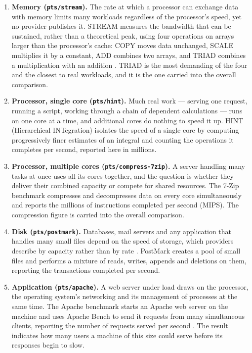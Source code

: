 \begin{enumerate}
  \item \textbf{Memory (\texttt{pts/stream}).} The rate at which a processor can exchange data with memory
  limits many workloads regardless of the processor's speed, yet no provider
  publishes it. STREAM measures the bandwidth that can be sustained, rather than a
  theoretical peak, using four operations on arrays larger than the processor's
  cache: COPY moves data unchanged, SCALE multiplies it by a constant, ADD combines
  two arrays, and TRIAD combines a multiplication with an addition
  \cite{McCalpin_STREAM,Gillam_FairBenchmarking_2013}. TRIAD is the most demanding
  of the four and the closest to real workloads, and it is the one carried into the
  overall comparison.

  \item \textbf{Processor, single core (\texttt{pts/hint}).} Much real work --- serving one request,
  running a script, working through a chain of dependent calculations --- runs on
  one core at a time, and additional cores do nothing to speed it up. HINT
  (Hierarchical INTegration) isolates the speed of a single core by computing
  progressively finer estimates of an integral and counting the operations it
  completes per second, reported here in millions.

  \item \textbf{Processor, multiple cores (\texttt{pts/compress-7zip}).} A server handling many tasks at once uses
  all its cores together, and the question is whether they deliver their combined
  capacity or compete for shared resources. The 7-Zip benchmark compresses and
  decompresses data on every core simultaneously and reports the millions of
  instructions completed per second (MIPS). The compression figure is carried into
  the overall comparison.

  \item \textbf{Disk (\texttt{pts/postmark}).} Databases, mail servers and any application that handles many
  small files depend on the speed of storage, which providers describe by capacity
  rather than by rate \cite{Gillam_FairBenchmarking_2013}. PostMark creates a pool
  of small files and performs a mixture of reads, writes, appends and deletions on
  them, reporting the transactions completed per second.

  \item \textbf{Application (\texttt{pts/apache}).} A web server under load draws on the processor, the
  operating system's networking and its management of processes at the same time.
  The Apache benchmark starts an Apache web server on the machine and uses Apache
  Bench to send it requests from many simultaneous clients, reporting the number of
  requests served per second \cite{ApacheBench}. The result indicates how many
  users a machine of this size could serve before its responses begin to slow.


\end{enumerate}
